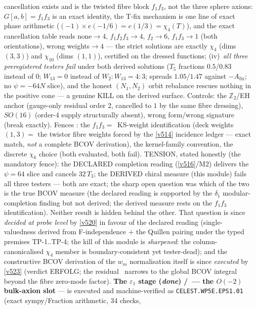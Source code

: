 \documentclass[11pt,a4paper]{article}
\newcommand{\Z}{\mathbb Z}
\begin{document}
\begin{itemize}
\begin{itemize}
{cancellation exists and is the twisted fibre block $f_1f_3$, not the three sphere axions}:
$G[a,b]=f_1f_3$ is an exact identity, the T-fix mechanism is one line of exact phase
arithmetic ($(-1)\times e(-1/6)=e(1/3)=\chi_4(T)$), and the exact cancellation table reads
none${}\to4$, $f_1f_2f_3\to4$, $f_2\to6$, $f_1f_3\to1$ (both orientations), wrong
weights${}\to4$ --- the strict solutions are exactly $\chi_4$ (dims $(3,3)$) and $\chi_{10}$
(dims $(1,1)$), certified on the dressed functions; (iv)~\emph{all three preregistered testers
fail} under both derived solutions ($T_5$ fractions $0.5$/$0.83$ instead of $0$; $W_{13}=0$
instead of $W_2{:}W_{13}=4{:}3$; spreads $1.05$/$1.47$ against $-A_{\mathrm{fix}}$; no
$\psi=-64N$ slice), and the honest $(N_1,N_2)$ orbit rebalance rescues nothing in the positive
cone --- a genuine KILL on the derived surface. Controls: the $\Z_2$/EH anchor (gauge-only
residual order $2$, cancelled to $1$ by the same fibre dressing), $SO(16)$ (order-4 supply
structurally absent), wrong form/wrong signature (break exactly). Fences \mC: the
$f_1f_3=$~KS-weight identification (deck weights $(1,3)=$ the twistor fibre weights forced by
the \vref{v514} incidence ledger --- exact match, \emph{not} a complete BCOV derivation), the
kernel-family convention, the discrete $\chi_k$ choice (both evaluated, both fail).
TENSION, stated honestly (the mandatory fence): the DECLARED completion reading (\vref{v516}/M2)
delivers the $\psi=64$ slice and cancels $32\,T_3$; the DERIVED chiral measure (this module)
fails all three testers --- both are exact; the sharp open question was which of the two is the
true BCOV measure (the declared reading is supported by the $\delta_1$ modular-completion
finding but not derived; the derived measure rests on the $f_1f_3$ identification). Neither
result is hidden behind the other. That question is since \emph{decided at probe level} by
\vref{v520} in favour of the declared reading (single-valuedness derived from F-independence
$+$ the Quillen pairing under the typed premises TP-1..TP-4; the kill of this module is
\emph{sharpened}: the column-canonicalised $\chi_4$ member is boundary-consistent yet
tester-dead); and the constructive BCOV derivation of the $w_m$ normalisation itself is
since \emph{executed} by \vref{v523} (verdict ERFOLG; the residual \mO\ narrows to the
global BCOV integral beyond the fibre zero-mode factor).
\textbf{The $\varepsilon_1$ stage (\emph{done}) \mE/\mC\ --- the $O(-2)$ bulk-axion slot} --- is
executed and machine-verified as \texttt{CELEST.WP5E.EPS1.01}
 (exact sympy/Fraction arithmetic, $34$ checks,

\end{itemize}
\end{itemize}
\end{document}
